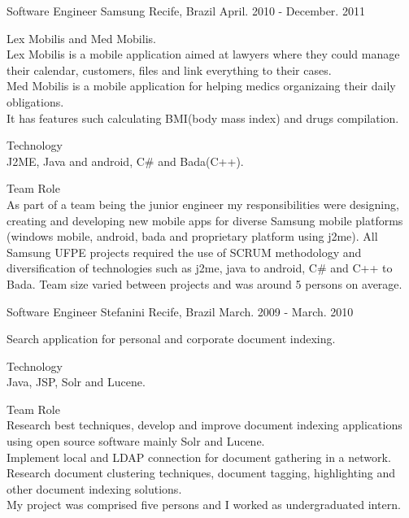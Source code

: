 \begin{cventries}
  \cventry
    {Software Engineer} %
    {Samsung} %
    {Recife, Brazil} %
    {April. 2010 - December. 2011} %
    {
      \begin{cvitems} %
\item{Lex Mobilis and Med Mobilis.\\
Lex Mobilis is a mobile application aimed at lawyers where they could manage their calendar, customers, files and link everything to their cases.\\
Med Mobilis is a mobile application for helping medics organizaing their daily obligations.\\
It has features such calculating BMI(body mass index) and drugs compilation.\\
}
\item{Technology\\
J2ME, Java and android, C\# and Bada(C++).\\
}
\item{Team Role\\
As part of a team being the junior engineer my responsibilities were designing, creating and developing new mobile apps for diverse Samsung mobile platforms (windows mobile, android, bada and proprietary platform using j2me). All Samsung UFPE projects required the use of SCRUM methodology and diversification of technologies such as j2me, java to android, C\# and C++ to Bada. Team size varied between projects and was around 5 persons on average.\\
}
      \end{cvitems}
    }

  \cventry
    {Software Engineer} %
    {Stefanini} %
    {Recife, Brazil} %
    {March. 2009 - March. 2010} %
    {
      \begin{cvitems} %
\item{Search application for personal and corporate document indexing.\\
}
\item{Technology\\
Java, JSP, Solr and Lucene.\\
}
\item{Team Role\\
Research best techniques, develop and improve document indexing applications using open source software mainly Solr and Lucene.\\
Implement local and LDAP connection for document gathering in a network. Research document clustering techniques, document tagging, highlighting and other document indexing solutions.\\
My project was comprised five persons and I worked as undergraduated intern.\\
}
      \end{cvitems}
    }


\end{cventries}
